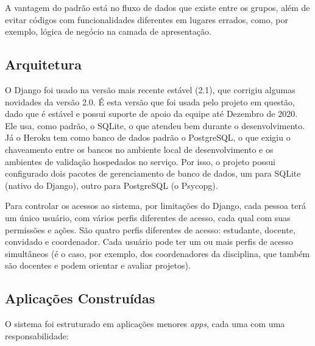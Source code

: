 A vantagem do padrão está no fluxo de dados que existe entre os grupos, além de evitar códigos com funcionalidades diferentes em lugares errados, como, por exemplo, lógica de negócio na camada de apresentação.

\subsection{Arquitetura}
O Django foi usado na versão mais recente estável (2.1), que corrigiu algumas novidades da versão 2.0. É esta versão que foi usada pelo projeto em questão, dado que é estável e possui suporte de apoio da equipe até Dezembro de 2020\cite{djangodownload}. Ele usa, como padrão, o SQLite, o que atendeu bem durante o desenvolvimento. Já o Heroku tem como banco de dados padrão o PostgreSQL, o que exigiu o chaveamento entre os bancos no ambiente local de desenvolvimento e os ambientes de validação hospedados no serviço. Por isso, o projeto possui configurado dois pacotes de gerenciamento de banco de dados, um para SQLite (nativo do Django), outro para PostgreSQL (o Psycopg\cite{lucassouto2017}).

Para controlar os acessos ao sistema, por limitações do Django, cada pessoa terá um único usuário, com vários perfis diferentes de acesso, cada qual com suas permissões e ações. São quatro perfis diferentes de acesso: estudante, docente, convidado e coordenador. Cada usuário pode ter um ou mais perfis de acesso simultâneos (é o caso, por exemplo, dos coordenadores da disciplina, que também são docentes e podem orientar e avaliar projetos).

\subsection{Aplicações Construídas}
O sistema foi estruturado em aplicações menores \textit{apps}, cada uma com uma responsabilidade:

